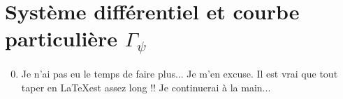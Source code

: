 \section{Système différentiel et courbe particulière $\Gamma_\psi$}

\begin{enumerate}
  \setcounter{enumi}{-1}
  \item Je n'ai pas eu le temps de faire plus... Je m'en excuse. Il est vrai que tout taper en \LaTeX est assez long !! Je continuerai à la main...
\end{enumerate}

